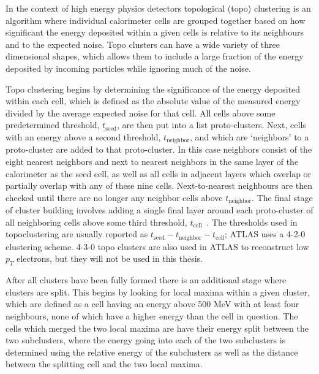 In the context of high energy physics detectors topological (topo) clustering is an algorithm where individual calorimeter cells are grouped together based on how significant the energy deposited within a given cells is relative to its neighbours and to the expected noise.  
Topo clusters can have a wide variety of three dimensional shapes, which allows them to include a large fraction of the energy deposited by incoming particles while ignoring much of the noise.  

Topo clustering begins by determining the significance of the energy deposited within each cell, which is defined as the absolute value of the measured energy divided by the average expected noise for that cell.  
All cells above some predetermined threshold, $t_{\mathrm{seed}}$, are then put into a list proto-clusters.  
Next, cells with an energy above a second threshold, $t_{\mathrm{neighbor}}$, and which are `neighbors' to a proto-cluster are added to that proto-cluster.  
In this case neighbors consist of the eight nearest neighbors and next to nearest neighbors in the same layer of the calorimeter as the seed cell, as well as all cells in adjacent layers which overlap or partially overlap with any of these nine cells.  
Next-to-nearest neighbours are then checked until there are no longer any neighbor cells above $t_{\mathrm{neighbor}}$.  
The final stage of cluster building involves adding a single final layer around each proto-cluster of all neighboring cells above some third threshold, $t_{\mathrm{cell}}$~\cite{1603.02934}.  
The thresholds used in topoclustering are usually reported as $t_{\mathrm{seed}}-t_{\mathrm{neighbor}}-t_{\mathrm{cell}}$; ATLAS uses a 4-2-0 clustering scheme.  
4-3-0 topo clusters are also used in ATLAS to reconstruct low $p_T$ electrons, but they will not be used in this thesis.   

After all clusters have been fully formed there is an additional stage where clusters are split.  
This begins by looking for local maxima within a given cluster, which are defined as a cell having an energy above 500 MeV with at least four neighbours, none of which have a higher energy than the cell in question.  
The cells which merged the two local maxima are have their energy split between the two subclusters, where the energy going into each of the two subclusters is determined using the relative energy of the subclusters as well as the distance between the splitting cell and the two local maxima.  
 
